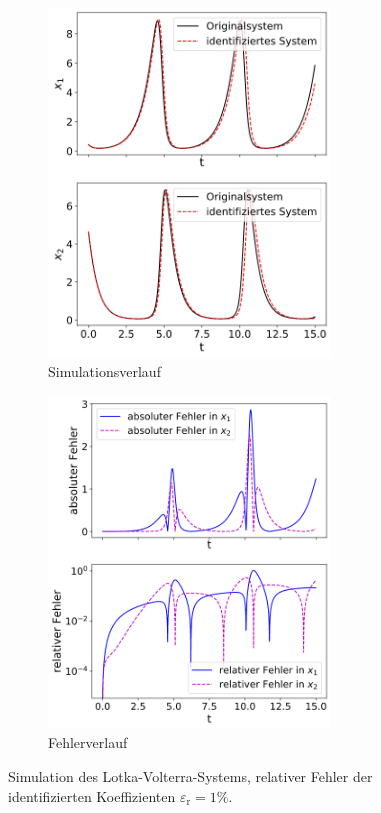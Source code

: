 \begin{figure}[h] %
	\centering
	\begin{subfigure}{.5\textwidth}
	  \centering
	  \includegraphics[width=75mm]{images/sim_volterra_e_0_01_sim.png}
	  \caption{Simulationsverlauf}
	  \label{fig:sim_volterra_e_0.01_sim}
	\end{subfigure}%
	\begin{subfigure}{.5\textwidth}
	  \centering
	  \includegraphics[width=75mm]{images/sim_volterra_e_0_01_err.png}
	  \caption{Fehlerverlauf}
	  \label{fig:sim_volterra_e_0.01_err}
	\end{subfigure}
	\caption{Simulation des Lotka-Volterra-Systems, relativer Fehler der identifizierten Koeffizienten $\varepsilon_\text{r} = 1 \%. $ }
	\label{fig:sim_volterra_e_0.01}
\end{figure}
